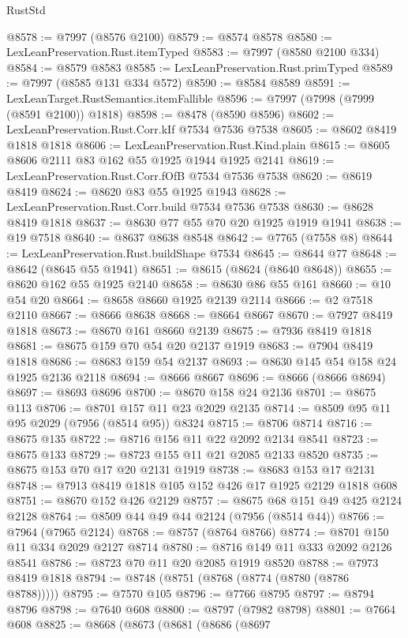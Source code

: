\begin{lexlean}{RustStd}
\begin{coremodule}
@8578 := @7997 (@8576 @2100)
@8579 := @8574 @8578
@8580 := LexLeanPreservation.Rust.itemTyped
@8583 := @7997 (@8580 @2100 @334)
@8584 := @8579 @8583
@8585 := LexLeanPreservation.Rust.primTyped
@8589 := @7997 (@8585 @131 @334 @572)
@8590 := @8584 @8589
@8591 := LexLeanTarget.RustSemantics.itemFallible
@8596 := @7997 (@7998 (@7999 (@8591 @2100)) @1818)
@8598 := @8478 (@8590 @8596)
@8602 := LexLeanPreservation.Rust.Corr.kIf @7534 @7536 @7538
@8605 := @8602 @8419 @1818 @1818
@8606 := LexLeanPreservation.Rust.Kind.plain
@8615 := @8605 @8606 @2111 @83 @162 @55 @1925 @1944 @1925 @2141
@8619 := LexLeanPreservation.Rust.Corr.fOfB @7534 @7536 @7538
@8620 := @8619 @8419
@8624 := @8620 @83 @55 @1925 @1943
@8628 := LexLeanPreservation.Rust.Corr.build @7534 @7536 @7538
@8630 := @8628 @8419 @1818
@8637 := @8630 @77 @55 @70 @20 @1925 @1919 @1941
@8638 := @19 @7518
@8640 := @8637 @8638 @8548
@8642 := @7765 (@7558 @8)
@8644 := LexLeanPreservation.Rust.buildShape @7534
@8645 := @8644 @77
@8648 := @8642 (@8645 @55 @1941)
@8651 := @8615 (@8624 (@8640 @8648))
@8655 := @8620 @162 @55 @1925 @2140
@8658 := @8630 @86 @55 @161
@8660 := @10 @54 @20
@8664 := @8658 @8660 @1925 @2139 @2114
@8666 := @2 @7518 @2110
@8667 := @8666 @8638
@8668 := @8664 @8667
@8670 := @7927 @8419 @1818
@8673 := @8670 @161 @8660 @2139
@8675 := @7936 @8419 @1818
@8681 := @8675 @159 @70 @54 @20 @2137 @1919
@8683 := @7904 @8419 @1818
@8686 := @8683 @159 @54 @2137
@8693 := @8630 @145 @54 @158 @24 @1925 @2136 @2118
@8694 := @8666 @8667
@8696 := @8666 (@8666 @8694)
@8697 := @8693 @8696
@8700 := @8670 @158 @24 @2136
@8701 := @8675 @113
@8706 := @8701 @157 @11 @23 @2029 @2135
@8714 := @8509 @95 @11 @95 @2029 (@7956 (@8514 @95)) @8324
@8715 := @8706 @8714
@8716 := @8675 @135
@8722 := @8716 @156 @11 @22 @2092 @2134 @8541
@8723 := @8675 @133
@8729 := @8723 @155 @11 @21 @2085 @2133 @8520
@8735 := @8675 @153 @70 @17 @20 @2131 @1919
@8738 := @8683 @153 @17 @2131
@8748 := @7913 @8419 @1818 @105 @152 @426 @17 @1925 @2129 @1818 @608
@8751 := @8670 @152 @426 @2129
@8757 := @8675 @68 @151 @49 @425 @2124 @2128
@8764 := @8509 @44 @49 @44 @2124 (@7956 (@8514 @44))
@8766 := @7964 (@7965 @2124)
@8768 := @8757 (@8764 @8766)
@8774 := @8701 @150 @11 @334 @2029 @2127 @8714
@8780 := @8716 @149 @11 @333 @2092 @2126 @8541
@8786 := @8723 @70 @11 @20 @2085 @1919 @8520
@8788 := @7973 @8419 @1818
@8794 := @8748 (@8751 (@8768 (@8774 (@8780 (@8786 @8788)))))
@8795 := @7570 @105
@8796 := @7766 @8795
@8797 := @8794 @8796
@8798 := @7640 @608
@8800 := @8797 (@7982 @8798)
@8801 := @7664 @608
@8825 := @8668
    (@8673
      (@8681
        (@8686
          (@8697

\end{coremodule}
\end{lexlean}
